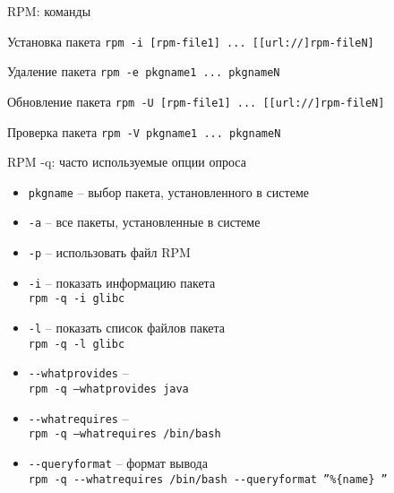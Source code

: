 \begin{frame}{RPM: команды}
	\begin{block}{Установка пакета}
		{\tt rpm -i [rpm-file1] ... [[url://]rpm-fileN] }
	\end{block}
	\begin{block}{Удаление пакета}
		{\tt rpm -e pkgname1 ... pkgnameN }
	\end{block}
	\begin{block}{Обновление пакета}
		{\tt rpm -U [rpm-file1] ... [[url://]rpm-fileN] }
	\end{block}
	\begin{block}{Проверка пакета}
		{\tt rpm -V pkgname1 ... pkgnameN }
	\end{block}
\end{frame}

\begin{frame}{RPM -q: часто используемые опции опроса}

	\begin{itemize}
		\item {\tt pkgname} -- выбор пакета, установленного в системе
		\item {\tt -a} -- все пакеты, установленные в системе
		\item {\tt -p} -- использовать файл RPM
	\end{itemize}


	\begin{itemize}
		\item {\tt -i} -- показать информацию пакета\\
			{\tt rpm \alert{-q} \alert{-i} glibc }
		\item {\tt -l} -- показать список файлов пакета \\
			{\tt rpm \alert{-q -l} glibc }
		\item {\tt -{}-whatprovides} -- \\
			{\tt rpm \alert{-q --whatprovides} java}
		\item {\tt -{}-whatrequires} -- \\
			{\tt rpm \alert{-q --whatrequires} /bin/bash}
		\item {\tt -{}-queryformat} -- формат вывода\\
			{\tt rpm \alert{-q -{}-whatrequires} /bin/bash \alert{-{}-queryformat ''\%\{name\} ''} }

	\end{itemize}

\end{frame}


